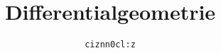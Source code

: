 \title{Differentialgeometrie}
\author{{\tt c\hspace{-1.8pt}izn\hspace{-1.3pt}n0c\hspace{-1.8pt}l:z}}
\maketitle

